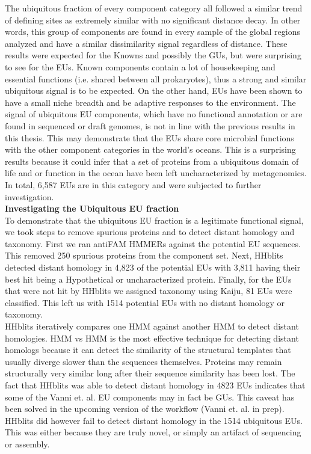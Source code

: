 The ubiquitous fraction of every component category all followed a similar trend of defining sites as extremely similar with no significant distance decay. In other words, this group of components are found in every sample of the global regions analyzed and have a similar dissimilarity signal regardless of distance. These results were expected for the Knowns and possibly the GUs, but were surprising to see for the EUs. Known components contain a lot of housekeeping and essential functions (i.e. shared between all prokaryotes), thus a strong and similar ubiquitous signal is to be expected. On the other hand, EUs have been shown to have a small niche breadth and be adaptive responses to the environment. The signal of ubiquitous EU components, which have no functional annotation or are found in sequenced or draft genomes, is not in line with the previous results in this thesis. This may demonstrate that the EUs share core microbial functions with the other component categories in the world's oceans. This is a surprising results because it could infer that a set of proteins from a ubiquitous domain of life and or function in the ocean have been left uncharacterized by metagenomics. In total, 6,587 EUs are in this category and were subjected to further investigation. \\

\textbf{Investigating the Ubiquitous EU fraction}\\

To demonstrate that the ubiquitous EU fraction is a legitimate functional signal, we took steps to remove spurious proteins and to detect distant homology and taxonomy. First we ran antiFAM HMMERs against the potential EU sequences. This removed 250 spurious proteins from the component set. Next, HHblits detected distant homology in 4,823 of the potential EUs with 3,811 having their best hit being a Hypothetical or uncharacterized protein. Finally, for the EUs that were not hit by HHblits we assigned taxonomy using Kaiju, 81 EUs were classified. This left us with 1514 potential EUs with no distant homology or taxonomy.\\

HHblits iteratively compares one HMM against another HMM to detect distant homologies. HMM vs HMM is the most effective technique for detecting distant homologs because it can detect the similarity of the structural templates that usually diverge slower than the sequences themselves. Proteins may remain structurally very similar long after their sequence similarity has been lost. The fact that HHblits was able to detect distant homology in 4823 EUs indicates that some of the Vanni et. al. EU components may in fact be GUs. This caveat has been solved in the upcoming version of the workflow (Vanni et. al. in prep). HHblits did however fail to detect distant homology in the 1514 ubiquitous EUs. This was either because they are truly novel, or simply an artifact of sequencing or assembly.\\

